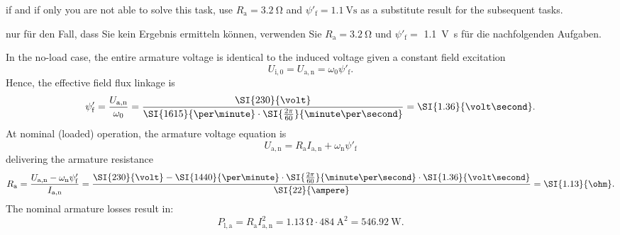 %
\begin{hintblock}
if and if only you are not able to solve this task, use $R_\mathrm{a} = \SI{3.2}{\ohm}$ and $\psi'_\mathrm{f} = \SI{1.1}{\volt\second}$ as a substitute result for the subsequent tasks.
\end{hintblock}

%
\begin{germanhintblock}
nur für den Fall, dass Sie kein Ergebnis ermitteln können, verwenden Sie $R_\mathrm{a} = \SI{3,2}{\ohm}$ und $\psi'_\mathrm{f} =$ \SI{1,1}{\volt\second} für die nachfolgenden Aufgaben.
\end{germanhintblock}


\begin{solutionblock}
    In the no-load case, the entire armature voltage is identical to the induced voltage given a constant field excitation
    $$
    U_\mathrm{i,0} = U_\mathrm{a,n} = \omega_0 \psi'_\mathrm{f}. 
    $$
    Hence, the effective field flux linkage is
    $$
    \psi'_\mathrm{f} = \frac{U_\mathrm{a,n}}{\omega_0} = \frac{\SI{230}{\volt}}{\SI{1615}{\per\minute} \cdot \SI{\frac{2\pi}{60}}{\minute\per\second}} = \SI{1.36}{\volt\second}.
    $$
    At nominal (loaded) operation, the armature voltage equation is
    $$
    U_\mathrm{a,n} = R_\mathrm{a}I_\mathrm{a,n} + \omega_\mathrm{n} \psi'_\mathrm{f}
    $$
    delivering the armature resistance
    $$
    R_\mathrm{a} = \frac{U_\mathrm{a,n} - \omega_\mathrm{n} \psi'_\mathrm{f}}{I_\mathrm{a,n}} = \frac{\SI{230}{\volt} - \SI{1440}{\per\minute} \cdot \SI{\frac{2\pi}{60}}{\minute\per\second} \cdot \SI{1.36}{\volt\second}}{\SI{22}{\ampere}} = \SI{1.13}{\ohm}.
    $$
    The nominal armature losses result in:
    $$
     P_\mathrm{l,a} = R_\mathrm{a} I^2_\mathrm{a,n} = \SI{1.13}{\ohm} \cdot \SI{484}{\ampere\squared} = \SI{546.92}{\watt}.
    $$
\end{solutionblock}

